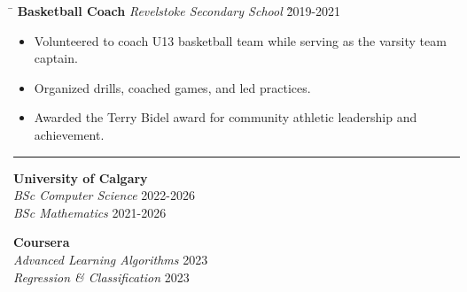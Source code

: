 \documentclass[a4paper,11pt]{article}
\def\locationh{\hspace{7cm}}
\def\sectionv{\vspace{.2cm}}
\def\subsectionv{\vspace{-5.3ex}}
\def\postpointsv{\vspace{0cm}}
\def\betweenjobsv{\vspace{0.4cm}}
\begin{document}
\betweenjobsv

\begin{tabbing}
    \locationh \= \kill
    \textbf{Basketball Coach} \> \textit{Revelstoke Secondary School} \` 2019-2021\\
\end{tabbing}

\begin{itemize}[leftmargin=.5cm, itemsep=.1cm, before=\subsectionv, after=\postpointsv]
    \item Volunteered to coach U13 basketball team while serving as the varsity team captain.
    \item Organized drills, coached games, and led practices.
    \item Awarded the Terry Bidel award for community athletic leadership and achievement.
\end{itemize}

\betweenjobsv

\noindent {}
\vspace{-2.35em} %
\par\noindent
\rule{\textwidth}{0.4pt}

\sectionv

\noindent
\begin{minipage}[t]{0.45\textwidth} %
    \textbf{University of Calgary} \\
    \textit{BSc Computer Science} \hfill 2022-2026 \\
    \textit{BSc Mathematics} \hfill 2021-2026
\end{minipage}
\hfill %
\begin{minipage}[t]{0.45\textwidth} %
    \textbf{Coursera} \\
    \textit{Advanced Learning Algorithms} \hfill 2023 \\
    \textit{Regression \& Classification} \hfill 2023
\end{minipage}
\end{document}
